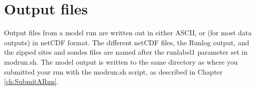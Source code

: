 \chapter{Output files}
\label{ch:output}

Output files from a model run are written out in either ASCII, or
(for most data outputs) in netCDF format. 
The different netCDF files, the Runlog output, and the zipped sites and sondes 
files are named after the runlabel1 parameter set in modrun.sh. 
The model output is written to the same directory as where you submitted 
your run with the modrun.sh script, as described in Chapter \ref{ch:SubmitARun}.
 


